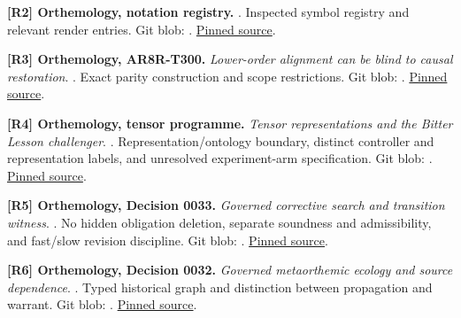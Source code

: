 \documentclass[11pt,a4paper]{article}
\begin{document}
\textbf{{[}R2{]} Orthemology, notation registry.}
. Inspected symbol registry and
relevant render entries. Git blob:
.
\href{https://github.com/theislampill/orthemology/blob/f50dc1aee52356cc6adbef342387576b02afc124/docs/notation-registry.yaml}{Pinned
source}.

\textbf{{[}R3{]} Orthemology, AR8R-T300.} \emph{Lower-order alignment
can be blind to causal restoration}.
.
Exact parity construction and scope restrictions. Git blob:
.
\href{https://github.com/theislampill/orthemology/blob/f50dc1aee52356cc6adbef342387576b02afc124/docs/project-closure/ar8r-v11/theorems/ar8r-t300-lower-order-alignment-blind-restoration.md}{Pinned
source}.

\textbf{{[}R4{]} Orthemology, tensor programme.} \emph{Tensor
representations and the Bitter Lesson challenger}.
.
Representation/ontology boundary, distinct controller and representation
labels, and unresolved experiment-arm specification. Git blob:
.
\href{https://github.com/theislampill/orthemology/blob/f50dc1aee52356cc6adbef342387576b02afc124/docs/project-closure/ar8r-v11/programs/tensor-and-bitter-lesson.md}{Pinned
source}.

\textbf{{[}R5{]} Orthemology, Decision 0033.} \emph{Governed corrective
search and transition witness}.
.
No hidden obligation deletion, separate soundness and admissibility, and
fast/slow revision discipline. Git blob:
.
\href{https://github.com/theislampill/orthemology/blob/f50dc1aee52356cc6adbef342387576b02afc124/docs/decisions/0033-governed-corrective-search-and-transition-witness.md}{Pinned
source}.

\textbf{{[}R6{]} Orthemology, Decision 0032.} \emph{Governed
metaorthemic ecology and source dependence}.
.
Typed historical graph and distinction between propagation and warrant.
Git blob: .
\href{https://github.com/theislampill/orthemology/blob/f50dc1aee52356cc6adbef342387576b02afc124/docs/decisions/0032-governed-metaorthemic-ecology-and-source-dependence.md}{Pinned
source}.
\end{document}
